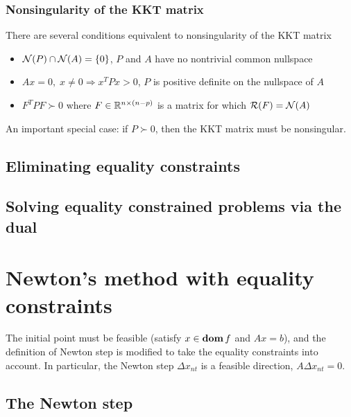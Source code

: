 \subsubsection{Nonsingularity of the KKT matrix}
There are several conditions equivalent to nonsingularity of the KKT matrix
\begin{itemize}
  \item ${\mathcal N}(P)\cap{\mathcal N}(A)=\{0\}$, \ie $P$ and $A$ have no nontrivial common nullspace
  \item $Ax=0,\;x\neq 0\Rightarrow x^TPx>0$, \ie $P$ is positive definite on the nullspace of $A$
  \item $F^TPF\succ 0$ where $F\in\mathbb{R}^{n\times (n-p)}$ is a matrix for which ${\mathcal R}(F)={\mathcal N}(A)$
\end{itemize}
An important special case: if $P\succ 0$, then the KKT matrix must be nonsingular.

\subsection{Eliminating equality constraints}
\label{subsec:10.1.2}

\subsection{Solving equality constrained problems via the dual}
\label{subsec:10.1.3}

\section{Newton's method with equality constraints}
The initial point must be feasible (\ie satisfy $x\in\mathop{\bf dom} f$ and $Ax=b$), and the definition of Newton step is modified to take the equality constraints into account.
In particular, the Newton step $\Delta x_{nt}$ is a feasible direction, \ie $A\Delta x_{nt}=0$.

\subsection{The Newton step}
